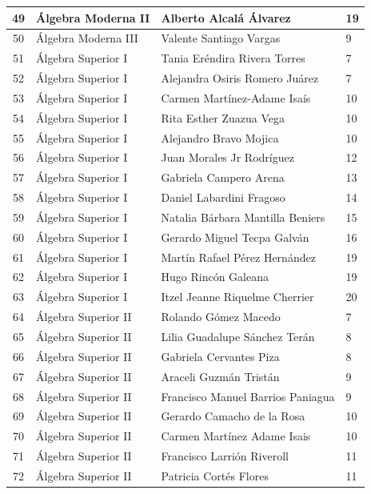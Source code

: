 {\begin{longtable}{|c|p{6.5cm}|p{5cm}|p{1.5cm}|}
  49 & Álgebra Moderna II & Alberto Alcalá Álvarez & 19 \\ \hline 
  50 & Álgebra Moderna III & Valente Santiago Vargas & 9 \\ \hline 
  51 & Álgebra Superior I & Tania Eréndira Rivera Torres & 7 \\ \hline 
  52 & Álgebra Superior I & Alejandra Osiris Romero Juárez & 7 \\ \hline 
  53 & Álgebra Superior I & Carmen Martínez-Adame Isaís & 10 \\ \hline 
  54 & Álgebra Superior I & Rita Esther Zuazua Vega & 10 \\ \hline 
  55 & Álgebra Superior I & Alejandro Bravo Mojica & 10 \\ \hline 
  56 & Álgebra Superior I & Juan Morales Jr Rodríguez & 12 \\ \hline 
  57 & Álgebra Superior I & Gabriela Campero Arena & 13 \\ \hline 
  58 & Álgebra Superior I & Daniel Labardini Fragoso & 14 \\ \hline 
  59 & Álgebra Superior I & Natalia Bárbara Mantilla Beniers & 15 \\ \hline 
  60 & Álgebra Superior I & Gerardo Miguel Tecpa Galván & 16 \\ \hline 
  61 & Álgebra Superior I & Martín Rafael Pérez Hernández & 19 \\ \hline 
  62 & Álgebra Superior I & Hugo Rincón Galeana & 19 \\ \hline 
  63 & Álgebra Superior I & Itzel Jeanne Riquelme Cherrier & 20 \\ \hline 
  64 & Álgebra Superior II & Rolando Gómez Macedo & 7 \\ \hline 
  65 & Álgebra Superior II & Lilia Guadalupe Sánchez Terán & 8 \\ \hline 
  66 & Álgebra Superior II & Gabriela Cervantes Piza & 8 \\ \hline 
  67 & Álgebra Superior II & Araceli Guzmán Tristán & 9 \\ \hline 
  68 & Álgebra Superior II & Francisco Manuel Barrios Paniagua & 9 \\ \hline 
  69 & Álgebra Superior II & Gerardo Camacho de la Rosa & 10 \\ \hline 
  70 & Álgebra Superior II & Carmen Martínez Adame Isais & 10 \\ \hline 
  71 & Álgebra Superior II & Francisco Larrión Riveroll & 11 \\ \hline 
  72 & Álgebra Superior II & Patricia Cortés Flores & 11 \\ \hline 

\end{longtable}}
